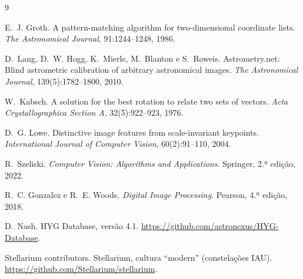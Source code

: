 \documentclass[11pt,a4paper]{article}
\begin{document}
\begin{thebibliography}{9}

E.~J. Groth.
\newblock A pattern-matching algorithm for two-dimensional coordinate lists.
\newblock \emph{The Astronomical Journal}, 91:1244--1248, 1986.

D.~Lang, D.~W. Hogg, K.~Mierle, M.~Blanton e S.~Roweis.
\newblock Astrometry.net: Blind astrometric calibration of arbitrary
  astronomical images.
\newblock \emph{The Astronomical Journal}, 139(5):1782--1800, 2010.

W.~Kabsch.
\newblock A solution for the best rotation to relate two sets of vectors.
\newblock \emph{Acta Crystallographica Section A}, 32(5):922--923, 1976.

D.~G. Lowe.
\newblock Distinctive image features from scale-invariant keypoints.
\newblock \emph{International Journal of Computer Vision}, 60(2):91--110,
  2004.

R.~Szeliski.
\newblock \emph{Computer Vision: Algorithms and Applications}.
\newblock Springer, 2.ª edição, 2022.

R.~C. Gonzalez e R.~E. Woods.
\newblock \emph{Digital Image Processing}.
\newblock Pearson, 4.ª edição, 2018.

D.~Nash.
\newblock HYG Database, versão 4.1.
\newblock \url{https://github.com/astronexus/HYG-Database}.

Stellarium contributors.
\newblock Stellarium, cultura ``modern'' (constelações IAU).
\newblock \url{https://github.com/Stellarium/stellarium}.

\end{thebibliography}
\end{document}
